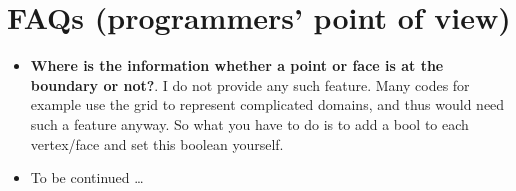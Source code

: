 \chapter{FAQs (programmers' point of view)}


\begin{itemize}
  \item \textbf{Where is the information whether a point or face is at the
  boundary or not?}.
  I do not provide any such feature. Many codes for example use the grid to
  represent complicated domains, and thus would need such a feature anyway. So
  what you have to do is to add a bool to each vertex/face and set this boolean
  yourself.
  \item To be continued \dots
\end{itemize}


